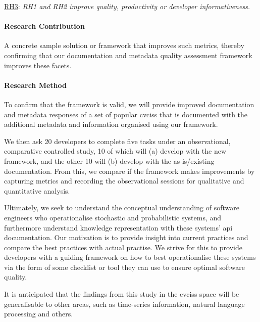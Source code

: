 \begin{titled-frame}{\underline{RH3}: \textit{RH1 and RH2 improve quality,  productivity or developer informativeness.} }
\paragraph{Research Contribution}
A concrete sample solution or framework that improves such metrics, thereby confirming that our documentation and metadata quality assessment framework improves these facets.

\paragraph{Research Method}

To confirm that the framework is valid, we will provide improved documentation and metadata responses of a set of popular \glspl{cvcis} that is documented with the additional metadata and information organised using our framework.

We then ask 20 developers to complete five tasks under an observational, comparative controlled study, 10 of which will (a) develop with the new framework, and the other 10 will (b) develop with the as-is/existing documentation. From this, we compare if the framework makes improvements by capturing metrics and recording the observational sessions for qualitative and quantitative analysis.
\end{titled-frame}

Ultimately, we seek to understand the conceptual understanding of software engineers who operationalise stochastic and probabilistic systems, and furthermore understand knowledge representation with these systems' \gls{api} documentation. Our motivation is to provide insight into current practices and compare the best practices with actual practise. We strive for this to  provide developers with a guiding framework on how to best operationalise these systems via the form of some checklist or tool they can use to ensure optimal software quality.

It is anticipated that the findings from this study in the \glspl{cvcis} space will be generalisable to other areas, such as time-series information, natural language processing and others.

